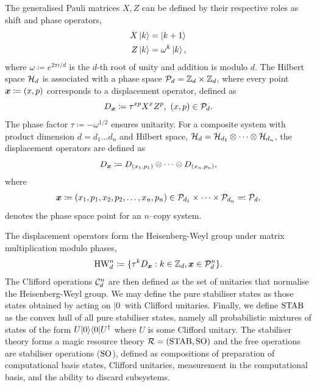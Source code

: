 \documentclass[pra,
aps,
twocolumn,
superscriptaddress,
groupedaddress,
nofootinbib,
reprint
]{revtex4-1}
\begin{document}
The generalised Pauli matrices $X, Z$ can be defined by their respective roles as shift and phase operators,
\begin{align}
    X \ket{k} &= \ket{k + 1} \label{eq:xpauli}\\
	Z \ket{k} &= \omega^k \ket{k}, \label{eq:zpauli}
\end{align}
where $\omega \coloneqq e^{2\pi i/d}$ is the $d$-th root of unity and addition is modulo $d$. The Hilbert space $\cal{H}_d$ is associated with a phase space $\cal{P}_d = \mathbb{Z}_d \times \mathbb{Z}_d$, where every point $\bmx \coloneqq (x, p)$ corresponds to a displacement operator, defined as
\begin{equation}\label{eq:ddef}
    D_{\bmx} \coloneqq \tau^{x p} X^{x} Z^{p},\ (x, p) \in \cal{P}_d.
\end{equation}
The phase factor $\tau \coloneqq -\omega^{1/2}$ ensures unitarity.
For a composite system with product dimension $d = d_1 \dots d_n$ and Hilbert space, $\cal{H}_d = \cal{H}_{d_1} \otimes \dots \otimes \cal{H}_{d_n}$, the displacement operators are defined as
\begin{equation}\label{eq:composited}
    D_{\bmx} \coloneqq D_{(x_1, p_1)} \otimes \dots \otimes D_{(x_n, p_n)},
\end{equation}
where 
\begin{align*}
	\bmx \coloneqq (x_1, p_1, x_2, p_2, \dots, x_n, p_n) \in \cal{P}_{d_1} \times \dots \times \cal{P}_{d_n} \eqqcolon  \cal{P}_d,
\end{align*}
denotes the phase space point for an $n$--copy system.

The displacement operators form the Heisenberg-Weyl group  under matrix multiplication modulo phases,
\begin{equation}\label{eq:gp}
    {\rm{HW}}_d^n \coloneqq \{ \tau^k D_{\bmx}: k \in \mathbb{Z}_d, \bmx \in \cal{P}_d^n\}.
\end{equation}
The Clifford operations $ \cal{C}_d^n $ are then defined as the set of unitaries that normalise the Heisenberg-Weyl group. We may define the pure stabiliser states as those states obtained by acting on $|0\>$ with Clifford unitaries. Finally, we define $\stab$ as the convex hull of all pure stabiliser states, namely all probabilistic mixtures of states of the form $U|0\>\<0|U^\dagger$ where $U$ is some Clifford unitary. The stabiliser theory forms a magic resource theory $\R = (\stab, \so)$
and the free operations are stabiliser operations ($\so$), defined as compositions of preparation of computational basis states, Clifford unitaries, measurement in the computational basis, and the ability to discard subsystems.
\end{document}
